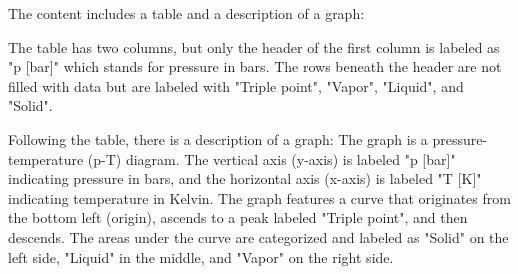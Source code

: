 The content includes a table and a description of a graph:

The table has two columns, but only the header of the first column is labeled as "p [bar]" which stands for pressure in bars. The rows beneath the header are not filled with data but are labeled with "Triple point", "Vapor", "Liquid", and "Solid".

Following the table, there is a description of a graph:
The graph is a pressure-temperature (p-T) diagram. The vertical axis (y-axis) is labeled "p [bar]" indicating pressure in bars, and the horizontal axis (x-axis) is labeled "T [K]" indicating temperature in Kelvin. The graph features a curve that originates from the bottom left (origin), ascends to a peak labeled "Triple point", and then descends. The areas under the curve are categorized and labeled as "Solid" on the left side, "Liquid" in the middle, and "Vapor" on the right side.